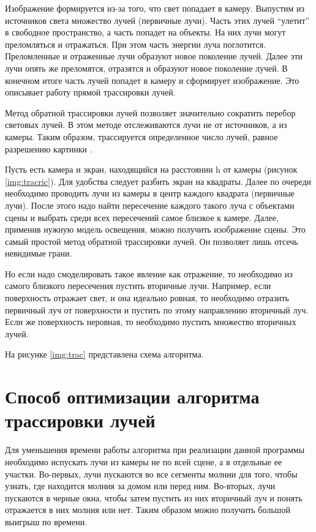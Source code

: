 Изображение формируется из-за того, что свет попадает в камеру. Выпустим из источников света множество лучей (первичные лучи). Часть этих лучей “улетит” в свободное пространство, а часть попадет на объекты. На них лучи могут преломляться и отражаться. При этом часть энергии луча поглотится. Преломленные и отраженные лучи образуют новое поколение лучей. Далее эти лучи опять же преломятся, отразятся и образуют новое поколение лучей. В конечном итоге часть лучей попадет в камеру и сформирует изображение. Это описывает работу прямой трассировки лучей.

Метод обратной трассировки лучей позволяет значительно сократить перебор световых лучей. В этом методе отслеживаются лучи не от источников, а из камеры. Таким образом, трассируется определенное число лучей, равное разрешению картинки \cite{raytrace}.   

 
Пусть есть камера и экран, находящийся на расстоянии h от камеры (рисунок \ref{img:tracric}). Для удобства следует разбить экран на квадраты. Далее по очереди необходимо проводить лучи из камеры в центр каждого квадрата (первичные лучи). После этого надо найти пересечение каждого такого луча с объектами сцены и выбрать среди всех пересечений самое близкое к камере. Далее, применив нужную модель освещения, можно получить изображение сцены. Это самый простой метод обратной трассировки лучей. Он позволяет лишь отсечь невидимые грани.

Но если надо смоделировать такое явление как отражение, то необходимо из самого близкого пересечения пустить вторичные лучи. Например, если поверхность отражает свет, и она идеально ровная, то необходимо отразить первичный луч от поверхности и пустить по этому направлению вторичный луч. Если же поверхность неровная, то необходимо пустить множество вторичных лучей. 

На рисунке \ref{img:trac} представлена схема алгоритма.


\clearpage

\section{Способ оптимизации алгоритма трассировки лучей}
Для уменьшения времени работы алгоритма при реализации данной программы необходимо испускать лучи из камеры не по всей сцене, а в отдельные ее участки. Во-первых, лучи пускаются во все сегменты молнии для того, чтобы узнать, где находится молния за домом или перед ним. Во-вторых, лучи пускаются в черные окна, чтобы затем пустить из них вторичный луч и понять отражается в них молния или нет. Таким образом можно получить большой выигрыш по времени.

